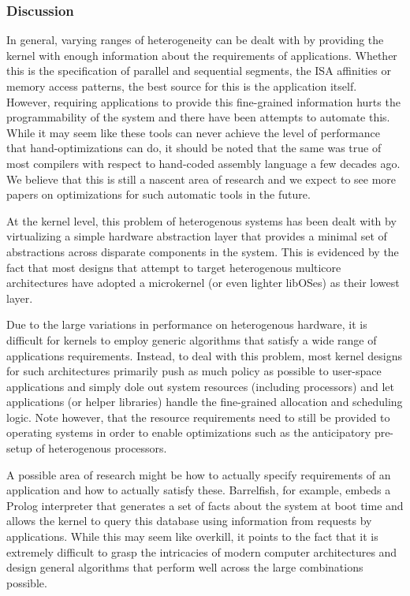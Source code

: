 \subsubsection{Discussion}

In general, varying ranges of heterogeneity can be dealt with by providing the kernel with enough information about the requirements of applications. Whether this is the specification of parallel and sequential segments, the ISA affinities or memory access patterns, the best source for this is the application itself. However, requiring applications to provide this fine-grained information hurts the programmability of the system and there have been attempts to automate this. While it may seem like these tools can never achieve the level of performance that hand-optimizations can do, it should be noted that the same was true of most compilers with respect to hand-coded assembly language a few decades ago. We believe that this is still a nascent area of research and we expect to see more papers on optimizations for such automatic tools in the future.

At the kernel level, this problem of heterogenous systems has been dealt with by virtualizing a simple hardware abstraction layer that provides a minimal set of abstractions across disparate components in the system. This is evidenced by the fact that most designs that attempt to target heterogenous multicore architectures have adopted a microkernel (or even lighter libOSes) as their lowest layer.

Due to the large variations in performance on heterogenous hardware, it is difficult for kernels to employ generic algorithms that satisfy a wide range of applications requirements. Instead, to deal with this problem, most kernel designs for such architectures primarily push as much policy as possible to user-space applications and simply dole out system resources (including processors) and let applications (or helper libraries) handle the fine-grained allocation and scheduling logic. Note however, that the resource requirements need to still be provided to operating systems in order to enable optimizations such as the anticipatory pre-setup of heterogenous processors.

A possible area of research might be how to actually specify requirements of an application and how to actually satisfy these. Barrelfish, for example, embeds a Prolog interpreter that generates a set of facts about the system at boot time and allows the kernel to query this database using information from requests by applications. While this may seem like overkill, it points to the fact that it is extremely difficult to grasp the intricacies of modern computer architectures and design general algorithms that perform well across the large combinations possible.

